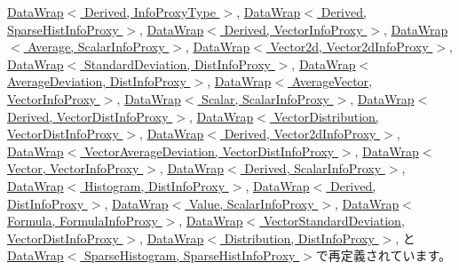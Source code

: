 \hyperlink{classStats_1_1DataWrap_aec129e6dc6d561f923a46dd5fa3a1908}{DataWrap$<$ Derived, InfoProxyType $>$}, \hyperlink{classStats_1_1DataWrap_aec129e6dc6d561f923a46dd5fa3a1908}{DataWrap$<$ Derived, SparseHistInfoProxy $>$}, \hyperlink{classStats_1_1DataWrap_aec129e6dc6d561f923a46dd5fa3a1908}{DataWrap$<$ Derived, VectorInfoProxy $>$}, \hyperlink{classStats_1_1DataWrap_aec129e6dc6d561f923a46dd5fa3a1908}{DataWrap$<$ Average, ScalarInfoProxy $>$}, \hyperlink{classStats_1_1DataWrap_aec129e6dc6d561f923a46dd5fa3a1908}{DataWrap$<$ Vector2d, Vector2dInfoProxy $>$}, \hyperlink{classStats_1_1DataWrap_aec129e6dc6d561f923a46dd5fa3a1908}{DataWrap$<$ StandardDeviation, DistInfoProxy $>$}, \hyperlink{classStats_1_1DataWrap_aec129e6dc6d561f923a46dd5fa3a1908}{DataWrap$<$ AverageDeviation, DistInfoProxy $>$}, \hyperlink{classStats_1_1DataWrap_aec129e6dc6d561f923a46dd5fa3a1908}{DataWrap$<$ AverageVector, VectorInfoProxy $>$}, \hyperlink{classStats_1_1DataWrap_aec129e6dc6d561f923a46dd5fa3a1908}{DataWrap$<$ Scalar, ScalarInfoProxy $>$}, \hyperlink{classStats_1_1DataWrap_aec129e6dc6d561f923a46dd5fa3a1908}{DataWrap$<$ Derived, VectorDistInfoProxy $>$}, \hyperlink{classStats_1_1DataWrap_aec129e6dc6d561f923a46dd5fa3a1908}{DataWrap$<$ VectorDistribution, VectorDistInfoProxy $>$}, \hyperlink{classStats_1_1DataWrap_aec129e6dc6d561f923a46dd5fa3a1908}{DataWrap$<$ Derived, Vector2dInfoProxy $>$}, \hyperlink{classStats_1_1DataWrap_aec129e6dc6d561f923a46dd5fa3a1908}{DataWrap$<$ VectorAverageDeviation, VectorDistInfoProxy $>$}, \hyperlink{classStats_1_1DataWrap_aec129e6dc6d561f923a46dd5fa3a1908}{DataWrap$<$ Vector, VectorInfoProxy $>$}, \hyperlink{classStats_1_1DataWrap_aec129e6dc6d561f923a46dd5fa3a1908}{DataWrap$<$ Derived, ScalarInfoProxy $>$}, \hyperlink{classStats_1_1DataWrap_aec129e6dc6d561f923a46dd5fa3a1908}{DataWrap$<$ Histogram, DistInfoProxy $>$}, \hyperlink{classStats_1_1DataWrap_aec129e6dc6d561f923a46dd5fa3a1908}{DataWrap$<$ Derived, DistInfoProxy $>$}, \hyperlink{classStats_1_1DataWrap_aec129e6dc6d561f923a46dd5fa3a1908}{DataWrap$<$ Value, ScalarInfoProxy $>$}, \hyperlink{classStats_1_1DataWrap_aec129e6dc6d561f923a46dd5fa3a1908}{DataWrap$<$ Formula, FormulaInfoProxy $>$}, \hyperlink{classStats_1_1DataWrap_aec129e6dc6d561f923a46dd5fa3a1908}{DataWrap$<$ VectorStandardDeviation, VectorDistInfoProxy $>$}, \hyperlink{classStats_1_1DataWrap_aec129e6dc6d561f923a46dd5fa3a1908}{DataWrap$<$ Distribution, DistInfoProxy $>$}, と \hyperlink{classStats_1_1DataWrap_aec129e6dc6d561f923a46dd5fa3a1908}{DataWrap$<$ SparseHistogram, SparseHistInfoProxy $>$}で再定義されています。


